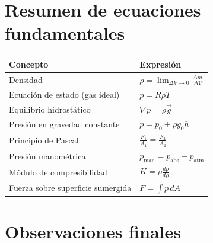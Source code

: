 \section{Resumen de ecuaciones fundamentales}

\begin{center}
\renewcommand{\arraystretch}{1.8}
\begin{tabular}{|l|l|}
\hline
\textbf{Concepto} & \textbf{Expresión} \\
\hline
Densidad & $\rho = \lim_{\Delta V\to 0}\frac{\Delta m}{\Delta V}$ \\
\hline
Ecuación de estado (gas ideal) & $p = R\rho T$ \\
\hline
Equilibrio hidrostático & $\nabla p = \rho\vec{g}$ \\
\hline
Presión en gravedad constante & $p = p_0 + \rho g_0 h$ \\
\hline
Principio de Pascal & $\frac{F_1}{A_1} = \frac{F_2}{A_2}$ \\
\hline
Presión manométrica & $p_{\text{man}} = p_{\text{abs}} - p_{\text{atm}}$ \\
\hline
Módulo de compresibilidad & $K = \rho\frac{dp}{d\rho}$ \\
\hline
Fuerza sobre superficie sumergida & $F = \int p\,dA$ \\
\hline
\end{tabular}
\end{center}

\section{Observaciones finales}

